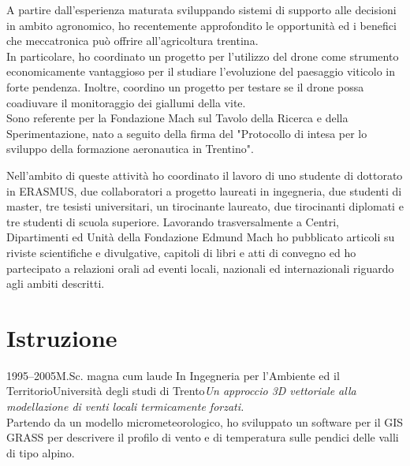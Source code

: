 \documentclass{curriculum}
\begin{document}
\begin{description}[style= unboxed, leftmargin= 6 pt, topsep= -3 pt, parsep= 3 pt, itemsep= 2pt]
     \item[Droni e agricoltura di precisione] A partire dall'esperienza maturata sviluppando sistemi di supporto alle decisioni in ambito agronomico, ho recentemente approfondito le opportunità ed i benefici che meccatronica può offrire all'agricoltura trentina.\\
     In particolare, ho coordinato un progetto per l'utilizzo del drone come strumento economicamente vantaggioso per il studiare l'evoluzione del paesaggio viticolo in forte pendenza. Inoltre, coordino un progetto per testare se il drone possa coadiuvare il monitoraggio dei giallumi della vite.\\
     Sono referente per la Fondazione Mach sul Tavolo della Ricerca e della Sperimentazione, nato a seguito della firma del "Protocollo di intesa per lo sviluppo della formazione aeronautica in Trentino".
    \end{description}
    \vspace{3pt}
    Nell'ambito di queste attività ho coordinato il lavoro di uno studente di dottorato in ERASMUS, due collaboratori a progetto laureati in ingegneria, due studenti di master, tre tesisti universitari, un tirocinante laureato, due tirocinanti diplomati e tre studenti di scuola superiore. Lavorando trasversalmente a Centri, Dipartimenti ed Unità della Fondazione Edmund Mach ho pubblicato articoli su riviste scientifiche e divulgative, capitoli di libri e atti di convegno ed ho partecipato a relazioni orali ad eventi locali, nazionali ed internazionali riguardo agli ambiti descritti. 
    
    \newpage
    
    \section{Istruzione}
    \begin{entrylist}
    \entry
        {1995--2005}{M.Sc. magna cum laude {\normalfont In Ingegneria per l'Ambiente ed il Territorio}}{Università degli studi di Trento}{\emph{Un approccio 3D vettoriale alla modellazione di venti locali termicamente forzati.}\hfill\vspace{2pt}\\
        Partendo da un modello micrometeorologico, ho sviluppato un software per il GIS GRASS per descrivere il profilo di vento e di temperatura sulle pendici delle valli di tipo alpino.}
    \end{entrylist}
    
\end{document}
